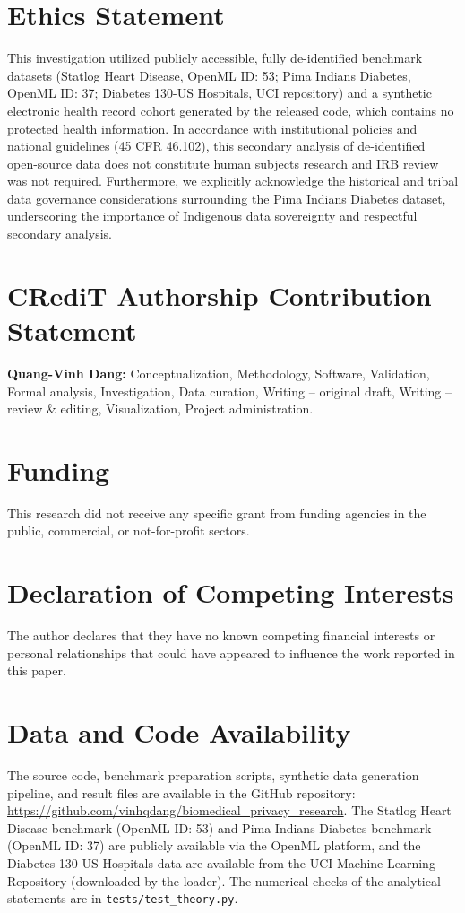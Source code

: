 \documentclass[3p,12pt]{elsarticle}
\theoremstyle{plain}
\theoremstyle{definition}
\begin{document}
\section*{Ethics Statement}
This investigation utilized publicly accessible, fully de-identified benchmark datasets (Statlog Heart Disease, OpenML ID: 53; Pima Indians Diabetes, OpenML ID: 37; Diabetes 130-US Hospitals, UCI repository) and a synthetic electronic health record cohort generated by the released code, which contains no protected health information. In accordance with institutional policies and national guidelines (45 CFR 46.102), this secondary analysis of de-identified open-source data does not constitute human subjects research and IRB review was not required. Furthermore, we explicitly acknowledge the historical and tribal data governance considerations surrounding the Pima Indians Diabetes dataset, underscoring the importance of Indigenous data sovereignty and respectful secondary analysis.

\section*{CRediT Authorship Contribution Statement}
\textbf{Quang-Vinh Dang:} Conceptualization, Methodology, Software, Validation, Formal analysis, Investigation, Data curation, Writing -- original draft, Writing -- review \& editing, Visualization, Project administration.

\section*{Funding}
This research did not receive any specific grant from funding agencies in the public, commercial, or not-for-profit sectors.

\section*{Declaration of Competing Interests}
The author declares that they have no known competing financial interests or personal relationships that could have appeared to influence the work reported in this paper.

\section*{Data and Code Availability}
The source code, benchmark preparation scripts, synthetic data generation pipeline, and result files are available in the GitHub repository: \url{https://github.com/vinhqdang/biomedical_privacy_research}. The Statlog Heart Disease benchmark (OpenML ID: 53) and Pima Indians Diabetes benchmark (OpenML ID: 37) are publicly available via the OpenML platform, and the Diabetes 130-US Hospitals data are available from the UCI Machine Learning Repository (downloaded by the loader). The numerical checks of the analytical statements are in \texttt{tests/test\_theory.py}.
\end{document}
